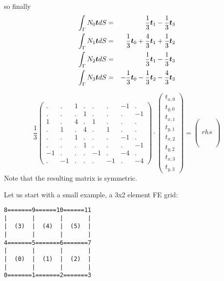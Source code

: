 \newpage
so finally
\begin{eqnarray}
\int_{\Gamma} N_0 {\bm t} dS &=& \frac{1}{3} {\bm t}_1 -  \frac{1}{3} {\bm t}_3  \nonumber\\ 
\int_{\Gamma} N_1 {\bm t} dS &=& \frac{1}{3} {\bm t}_0 + \frac{4}{3} {\bm t}_1 +  \frac{1}{3} {\bm t}_2 \nonumber\\   
\int_{\Gamma} N_2 {\bm t} dS &=& \frac{1}{3} {\bm t}_1  -\frac{1}{3}  {\bm t}_3\nonumber\\ 
\int_{\Gamma} N_3 {\bm t} dS &=& -\frac{1}{3} {\bm t}_0 - \frac{1}{3} {\bm t}_2 - \frac{4}{3} {\bm t}_3 \nonumber
\end{eqnarray}
 
\[
\frac{1}{3}
\left(
\begin{array}{cccccccc}
. &. &1 &. &. &. &-1 & .\\
.& . &. &1 &. &. &. &-1 \\
1 & . & 4 & . & 1 &. & .& .\\
. &1 & . & 4 & . & 1 &. & . \\
. & . & 1 & .& . & . & -1 & .\\
. & . & . & 1 & .& . & . & -1 \\
-1 & . & . & . & -1 & .  & -4 & . \\
. & -1 & . & . & . & -1 & .  & -4  
\end{array}
\right)
\cdot
\left(
\begin{array}{c}
t_{x,0}\\
t_{y,0}\\
t_{x,1}\\
t_{y,1}\\
t_{x,2}\\
t_{y,2}\\
t_{x,3}\\
t_{y,3}
\end{array}
\right)
=
\left(
\begin{array}{c}
\\
\\
\\
rhs\\
\\
\\
\\
\end{array}
\right)
\]
Note that the resulting matrix is symmetric.


\newpage
Let us start with a small example, a 3x2 element FE grid:

\begin{center}
\begin{verbatim}
8=======9======10======11
|       |       |       |
|  (3)  |  (4)  |  (5)  |
|       |       |       |
4=======5=======6=======7
|       |       |       |
|  (0)  |  (1)  |  (2)  |
|       |       |       |
0=======1=======2=======3
\end{verbatim}
\end{center}


